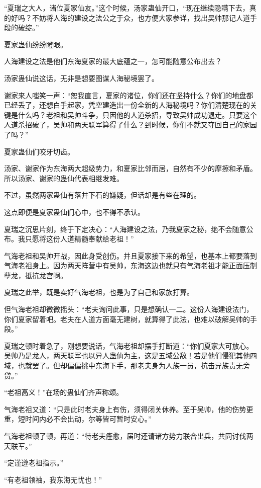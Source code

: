 \begin{this_body}
“夏瑞之大人，诸位夏家仙友。”这个时候，汤家蛊仙开口，“现在继续隐瞒下去，真的好吗？不妨将人海的建设之法公之于众，也方便大家参详，找出吴帅那记人道手段的破绽。”

夏家蛊仙纷纷瞪眼。

人海建设之法是他们东海夏家的最大底蕴之一，怎可能随意公布出去？

汤家蛊仙说这话，无非是想要图谋人海秘境罢了。

谢家来人嗤笑一声：“恕我直言，夏家的诸位，你们还在坚持什么？你们的地盘都已经丢了，还想白手起家，凭空建造出一份全新的人海秘境吗？你们清楚现在的关键是什么吗？老祖和吴帅斗争，只因他的人道杀招，导致吴帅成功退走。只要这个人道杀招破了，吴帅和两天联军算得了什么？到时候，你们不就又夺回自己的家园了吗？”

夏家蛊仙们咬牙切齿。

汤家、谢家作为东海两大超级势力，和夏家比邻而居，自然有不少的摩擦和矛盾。所以汤家、谢家的蛊仙代表相继发难。

不过，虽然两家蛊仙有落井下石的嫌疑，但话却是有些在理的。

这点即便是夏家蛊仙们心中，也不得不承认。

夏瑞之沉思片刻，终于下定决心：“人海建设之法，乃我夏家之秘，绝不会随意公布。我只愿将这份人道精髓奉献给老祖！”

气海老祖和吴帅开战，因此身受创伤。并且夏家接下来的希望，也基本上都要落到气海老祖身上。因为两天阵营中有吴帅，东海这边也就只有气海老祖才能正面压制孽龙，抵抗龙宫啊。

夏瑞之此举，既是卖好气海老祖，也是为了自己和家族打算。

但气海老祖却微微摇头：“老夫询问此事，只是想确认一二。这份人海建设法门，你们夏家留着吧。老夫在人道方面毫无建树，就算得了此法，也难以破解吴帅的手段。”

夏瑞之顿时着急了，刚想要说话，气海老祖却摆手打断道：“你们夏家大可放心。吴帅乃是龙人，两天联军也以异人蛊仙为主，这是五域公敌！若是他们侵犯其他四域，也就罢了。但却偏偏挑中东海下手，那老夫身为人族一员，抗击异族责无旁贷。”

“老祖高义！”在场的蛊仙们齐声称颂。

气海老祖又道：“只是此时老夫身上有伤，须得闭关休养。至于吴帅，他的伤势更重，短时间内必不会出动，尔等皆可暂时安心。”

气海老祖顿了顿，再道：“待老夫痊愈，届时还请诸方势力联合出兵，共同讨伐两天联军。”

“定谨遵老祖指示。”

“有老祖领袖，我东海无忧也！”


\end{this_body}

